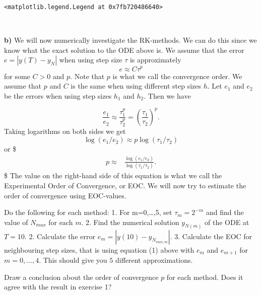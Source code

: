 \documentclass[11pt]{article}
\makeatletter
\newcommand{\boxspacing}{\kern\kvtcb@left@rule\kern\kvtcb@boxsep}
\newcommand{\prompt}[4]{
        {\ttfamily\llap{{\color{#2}[#3]:\hspace{3pt}#4}}\vspace{-\baselineskip}}
    }
\makeatother
\begin{document}
            \begin{tcolorbox}[breakable, size=fbox, boxrule=.5pt, pad at break*=1mm, opacityfill=0]
\prompt{Out}{outcolor}{6}{\boxspacing}
\begin{Verbatim}[commandchars=\\\{\}]
<matplotlib.legend.Legend at 0x7fb720486640>
\end{Verbatim}
\end{tcolorbox}
        
    \begin{center}
    \end{center}
    { \hspace*{\fill} \\}
    
    \textbf{b)} We will now numerically investigate the RK-methods. We can
do this since we know what the exact solution to the ODE above is. We
assume that the error \(e = |y(T) - y_N|\) when using step size \(\tau\)
is approximately \[
e \approx C\tau^p
\] for some \(C>0\) and \(p.\) Note that \(p\) is what we call the
convergence order. We assume that \(p\) and \(C\) is the same when using
different step sizes \(h\). Let \(e_1\) and \(e_2\) be the errors when
using step sizes \(h_1\) and \(h_2\). Then we have

\[
\frac{e_1}{e_2} \approx \frac{\tau_1^p}{\tau_2^p} = \left(\frac{\tau_1}{\tau_2}\right)^p.
\] Taking logarithms on both sides we get \[
\log(e_1/e_2) \approx p \log(\tau_1/\tau_2)
\] or \$ \begin{align}
p \approx& \frac{\log(e_1/e_2)}{\log(\tau_1/\tau_2)}.
\end{align} \$ The value on the right-hand side of this equation is what
we call the Experimental Order of Convergence, or EOC. We will now try
to estimate the order of convergence using EOC-values.

Do the following for each method: 1. For m=0,\ldots,5, set
\(\tau_m=2^{-m}\) and find the value of \(N_{max}\) for each \(m\). 2.
Find the numerical solution \(y_{N(m)}\) of the ODE at \(T = 10\). 2.
Calculate the error \(e_m = |y(10) - y_{N_{max,m}}|\). 3. Calculate the
EOC for neighbouring step sizes, that is using equation (1) above with
\(e_m\) and \(e_{m+1}\) for \(m=0,...,4\). This should give you \(5\)
different approximations.

Draw a conclusion about the order of convergence \(p\) for each method.
Does it agree with the result in exercise 1?
\end{document}
